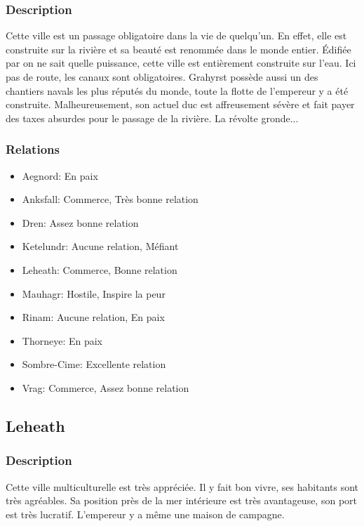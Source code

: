 \subsubsection{Description}
\hypertarget {grahyrst}{}Cette ville est un passage obligatoire dans la vie de quelqu’un. En effet, elle est construite sur la rivière et sa beauté est renommée dans le monde entier. Édifiée par on ne sait quelle puissance, cette ville est entièrement construite sur l’eau. Ici pas de route, les canaux sont obligatoires. Grahyrst possède aussi un des chantiers navals les plus réputés du monde, toute la flotte de l’empereur y a été construite. Malheureusement, son actuel duc est affreusement sévère et fait payer des taxes absurdes pour le passage de la rivière. La révolte gronde...
\subsubsection{Relations} 
\begin{itemize}
\item Aegnord: En paix  
\item Anksfall: Commerce, Très bonne relation 
\item Dren: Assez bonne relation    
\item Ketelundr: Aucune relation, Méfiant 
\item Leheath: Commerce, Bonne relation 
\item Mauhagr: Hostile, Inspire la peur  
\item Rinam: Aucune relation, En paix 
\item Thorneye: En paix 
\item Sombre-Cime: Excellente relation 
\item Vrag: Commerce, Assez bonne relation 
\end{itemize}
\subsection{Leheath}
\subsubsection{Description}
\hypertarget {leheath}{}Cette ville multiculturelle est très appréciée.
Il y fait bon vivre, ses habitants sont très agréables.
Sa position près de la mer intérieure est très avantageuse, son port est très lucratif.
L'empereur y a même une maison de campagne.
